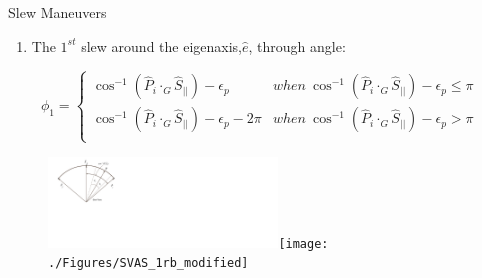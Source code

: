 \documentclass{beamer}
\begin{document}
\begin{frame}
\begin{block}{Slew Maneuvers}
\begin{enumerate}
\item The $1^{st}$ slew around the eigenaxis,$\hat{e}$, through angle:
\end{enumerate}
 \begin{equation}
 \phi_1=\left\{
                \begin{array}{ll}
                 \cos^{-1}(\hat{P}_i\cdot_G\hat{S}_{||})-\epsilon_p& when\  \cos^{-1}(\hat{P}_i\cdot_G\hat{S}_{||})-\epsilon_p\leq \pi\\
                 \cos^{-1}(\hat{P}_i\cdot_G\hat{S}_{||})-\epsilon_p-2\pi& when\ \cos^{-1}(\hat{P}_i\cdot_G\hat{S}_{||})-\epsilon_p>\pi\\
                \end{array}
              \right.
 \end{equation}
\begin{figure}
\includegraphics[width=2.4in]{./Figures/SVAS_1r_modified}\texttt{[image: ./Figures/SVAS\_1rb\_modified]}
\end{figure}
\end{block}
\end{frame}
\end{document}

